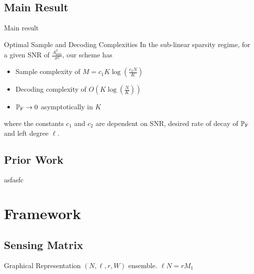 \documentclass[10pt]{beamer}
\begin{document}
\subsection{Main Result}
\begin{frame}{Main result}

\begin{block}{Optimal Sample and Decoding Complexities}
In the sub-linear sparsity regime, for a given SNR of $\frac{A^{2}_{\text{min}}}{\sigma^{2}}$, our scheme has 
\begin{itemize}
\item Sample complexity of $M=c_1 K\log (\frac{c_2 N}{K})$
\item Decoding complexity of $O\left(K\log(\frac{N}{K})\right)$ 
\item $\mathbb{P}_{\text{F}}\rightarrow 0$ asymptotically in $K$
\end{itemize} 
where the constants $c_{1}$ and $c_{2}$ are dependent on SNR, desired rate of decay of $\mathbb{P}_{\text{F}}$ and left degree $\ell$.
\end{block}
\end{frame}

\subsection{Prior Work}
\begin{frame}
asfasfc
\end{frame}

\section{Framework}
\subsection{Sensing Matrix}
\begin{frame}{Graphical Representation}
$(N,\ell,r,W)$ ensemble. $\ell N=rM_1$
\begin{figure}
\scalebox{1.3}{}
\end{figure}
\end{frame}
\end{document}
